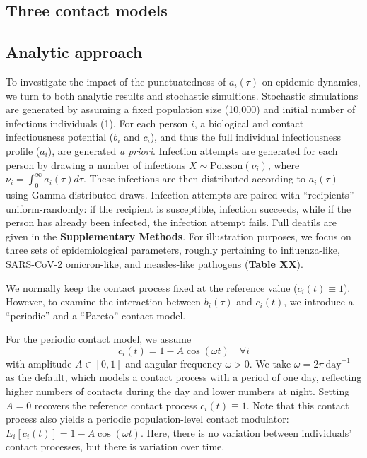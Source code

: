 \subsection{Three contact models}



\subsection{Analytic approach}

To investigate the impact of the punctuatedness of $a_i(\tau)$ on epidemic dynamics, we turn to both analytic results and stochastic simultions. Stochastic simulations are generated by assuming a fixed population size (10,000) and initial number of infectious individuals (1). For each person $i$, a biological and contact infectiousness potential ($b_i$ and $c_i$), and thus the full individual infectiousness profile ($a_i$), are generated {\it a priori}. Infection attempts are generated for each person by drawing a number of infections $X \sim \text{Poisson}(\nu_i)$, where $\nu_i = \int_0^\infty a_i(\tau) d\tau$. These infections are then distributed according to $a_i(\tau)$ using Gamma-distributed draws. Infection attempts are paired with ``recipients'' uniform-randomly: if the recipient is susceptible, infection succeeds, while if the person has already been infected, the infection attempt fails. Full deatils are given in the {\bf Supplementary Methods}. For illustration purposes, we focus on three sets of epidemiological parameters, roughly pertaining to influenza-like, SARS-CoV-2 omicron-like, and measles-like pathogens ({\bf Table XX}). 

We normally keep the contact process fixed at the reference value ($c_i(t) \equiv 1$). However, to examine the interaction between $b_i(\tau)$ and $c_i(t)$, we introduce a ``periodic'' and a ``Pareto'' contact model. 

For the periodic contact model, we assume
%
\begin{equation}
    c_i(t) = 1 - A \cos(\omega t) \quad \forall i
    \label{eq:periodic_c}
\end{equation}
%
with amplitude $A \in [0,1]$ and angular frequency $\omega > 0$. We take $\omega = 2\pi\,\text{day}^{-1}$ as the default, which models a contact process with a period of one day, reflecting higher numbers of contacts during the day and lower numbers at night. Setting $A = 0$ recovers the reference contact process $c_i(t) \equiv 1$. Note that this contact process also yields a periodic population-level contact modulator: $E_i[c_i(t)] = 1 - A \cos(\omega t)$. Here, there is no variation between individuals' contact processes, but there is variation over time. 

